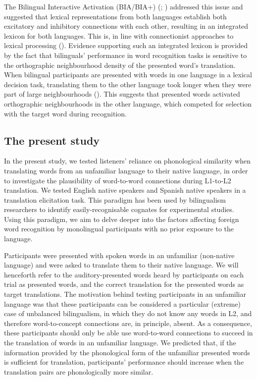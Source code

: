\documentclass[
]{article}
\begin{document}
The Bilingual Interactive Activation (BIA/BIA+)
(;
) addressed
this issue and suggested that lexical representations from both
languages establish both excitatory and inhibitory connections with each
other, resulting in an integrated lexicon for both languages. This is,
in line with connectionist approaches to lexical processing
(). Evidence supporting such an integrated lexicon is provided by
the fact that bilinguals' performance in word recognition tasks is
sensitive to the orthographic neighbourhood density of the presented
word's translation. When bilingual participants are presented with words
in one language in a lexical decision task, translating them to the
other language took longer when they were part of large neighbourhoods
(). This
suggests that presented words activated orthographic neighbourhoods in
the other language, which competed for selection with the target word
during recognition.

\subsection{The present study}\label{the-present-study}

In the present study, we tested listeners' reliance on phonological
similarity when translating words from an unfamiliar language to their
native language, in order to investigate the plausibility of
word-to-word connections during L1-to-L2 translation. We tested English
native speakers and Spanish native speakers in a translation elicitation
task. This paradigm has been used by bilingualism researchers to
identify easily-recognisable cognates for experimental studies. Using
this paradigm, we aim to delve deeper into the factors affecting foreign
word recognition by monolingual participants with no prior exposure to
the language.

Participants were presented with spoken words in an unfamiliar
(non-native language) and were asked to translate them to their native
language. We will henceforth refer to the auditory-presented words heard
by participants on each trial as presented words, and the correct
translation for the presented words as target translations. The
motivation behind testing participants in an unfamiliar language was
that these participants can be considered a particular (extreme) case of
unbalanced bilingualism, in which they do not know any words in L2, and
therefore word-to-concept connections are, in principle, absent. As a
consequence, these participants should only be able use word-to-word
connections to succeed in the translation of words in an unfamiliar
language. We predicted that, if the information provided by the
phonological form of the unfamiliar presented words is sufficient for
translation, participants' performance should increase when the
translation pairs are phonologically more similar.
\end{document}
